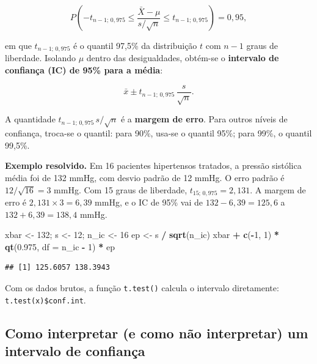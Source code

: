 \documentclass[
]{book}
\newenvironment{Shaded}{\begin{snugshade}}{\end{snugshade}}
\newcommand{\AttributeTok}[1]{\textcolor[rgb]{0.13,0.29,0.53}{#1}}
\newcommand{\DecValTok}[1]{\textcolor[rgb]{0.00,0.00,0.81}{#1}}
\newcommand{\FloatTok}[1]{\textcolor[rgb]{0.00,0.00,0.81}{#1}}
\newcommand{\FunctionTok}[1]{\textcolor[rgb]{0.13,0.29,0.53}{\textbf{#1}}}
\newcommand{\NormalTok}[1]{#1}
\newcommand{\OtherTok}[1]{\textcolor[rgb]{0.56,0.35,0.01}{#1}}
\newcommand{\SpecialCharTok}[1]{\textcolor[rgb]{0.81,0.36,0.00}{\textbf{#1}}}
\begin{document}
\[
P\left(-t_{n-1;\,0{,}975} \le \frac{\bar{X} - \mu}{s/\sqrt{n}} \le t_{n-1;\,0{,}975}\right) = 0{,}95,
\]

em que \(t_{n-1;\,0{,}975}\) é o quantil 97,5\% da distribuição \(t\) com \(n - 1\) graus de liberdade. Isolando \(\mu\) dentro das desigualdades, obtém-se o \textbf{intervalo de confiança (IC) de 95\% para a média}:

\begin{equation}
\bar{x} \pm t_{n-1;\,0{,}975}\,\frac{s}{\sqrt{n}}.
\label{eq:ic-media}
\end{equation}

A quantidade \(t_{n-1;\,0{,}975}\,s/\sqrt{n}\) é a \textbf{margem de erro}. Para outros níveis de confiança, troca-se o quantil: para 90\%, usa-se o quantil 95\%; para 99\%, o quantil 99,5\%.

\textbf{Exemplo resolvido.} Em 16 pacientes hipertensos tratados, a pressão sistólica média foi de 132 mmHg, com desvio padrão de 12 mmHg. O erro padrão é \(12/\sqrt{16} = 3\) mmHg. Com 15 graus de liberdade, \(t_{15;\,0{,}975} = 2{,}131\). A margem de erro é \(2{,}131 \times 3 = 6{,}39\) mmHg, e o IC de 95\% vai de \(132 - 6{,}39 = 125{,}6\) a \(132 + 6{,}39 = 138{,}4\) mmHg.

\begin{Shaded}
\begin{Highlighting}[]
\NormalTok{xbar }\OtherTok{\textless{}{-}} \DecValTok{132}\NormalTok{; s }\OtherTok{\textless{}{-}} \DecValTok{12}\NormalTok{; n\_ic }\OtherTok{\textless{}{-}} \DecValTok{16}
\NormalTok{ep }\OtherTok{\textless{}{-}}\NormalTok{ s }\SpecialCharTok{/} \FunctionTok{sqrt}\NormalTok{(n\_ic)}
\NormalTok{xbar }\SpecialCharTok{+} \FunctionTok{c}\NormalTok{(}\SpecialCharTok{{-}}\DecValTok{1}\NormalTok{, }\DecValTok{1}\NormalTok{) }\SpecialCharTok{*} \FunctionTok{qt}\NormalTok{(}\FloatTok{0.975}\NormalTok{, }\AttributeTok{df =}\NormalTok{ n\_ic }\SpecialCharTok{{-}} \DecValTok{1}\NormalTok{) }\SpecialCharTok{*}\NormalTok{ ep}
\end{Highlighting}
\end{Shaded}

\begin{verbatim}
## [1] 125.6057 138.3943
\end{verbatim}

Com os dados brutos, a função \texttt{t.test()} calcula o intervalo diretamente: \texttt{t.test(x)\$conf.int}.

\subsection{Como interpretar (e como não interpretar) um intervalo de confiança}\label{como-interpretar-e-como-nuxe3o-interpretar-um-intervalo-de-confianuxe7a}
\end{document}
